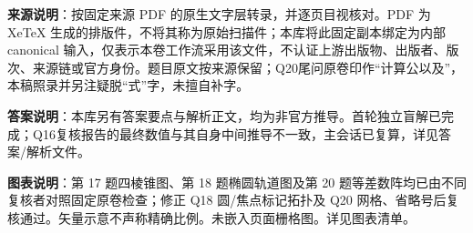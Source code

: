 


\begin{gktip}
\textbf{来源说明}：按固定来源 PDF 的原生文字层转录，并逐页目视核对。PDF 为 XeTeX 生成的排版件，不将其称为原始扫描件；本库将此固定副本绑定为内部 canonical 输入，仅表示本卷工作流采用该文件，不认证上游出版物、出版者、版次、来源链或官方身份。题目原文按来源保留；Q20尾问原卷印作“计算公以及”，本稿照录并另注疑脱“式”字，未擅自补字。

\textbf{答案说明}：本库另有答案要点与解析正文，均为非官方推导。首轮独立盲解已完成；Q16复核报告的最终数值与其自身中间推导不一致，主会话已复算，详见答案/解析文件。

\textbf{图表说明}：第 17 题四棱锥图、第 18 题椭圆轨道图及第 20 题等差数阵均已由不同复核者对照固定原卷检查；修正 Q18 圆/焦点标记拓扑及 Q20 网格、省略号后复核通过。矢量示意不声称精确比例。未嵌入页面栅格图。详见图表清单。
\end{gktip}


